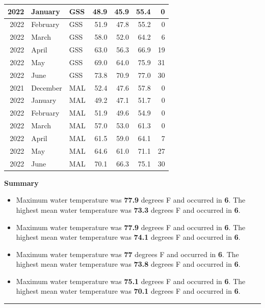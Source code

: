 \documentclass[
]{book}
\providecommand{\tightlist}{%
  \setlength{\itemsep}{0pt}\setlength{\parskip}{0pt}}
\theoremstyle{definition}
\theoremstyle{definition}
\theoremstyle{definition}
\theoremstyle{definition}
\theoremstyle{remark}
\begin{document}
\begin{table}
\begin{tabular}[t]{rllrrrr}
\hline
2022 & January & GSS & 48.9 & 45.9 & 55.4 & 0\\
\hline
2022 & February & GSS & 51.9 & 47.8 & 55.2 & 0\\
\hline
2022 & March & GSS & 58.0 & 52.0 & 64.2 & 6\\
\hline
2022 & April & GSS & 63.0 & 56.3 & 66.9 & 19\\
\hline
2022 & May & GSS & 69.0 & 64.0 & 75.9 & 31\\
\hline
2022 & June & GSS & 73.8 & 70.9 & 77.0 & 30\\
\hline
2021 & December & MAL & 52.4 & 47.6 & 57.8 & 0\\
\hline
2022 & January & MAL & 49.2 & 47.1 & 51.7 & 0\\
\hline
2022 & February & MAL & 51.9 & 49.6 & 54.9 & 0\\
\hline
2022 & March & MAL & 57.0 & 53.0 & 61.3 & 0\\
\hline
2022 & April & MAL & 61.5 & 59.0 & 64.1 & 7\\
\hline
2022 & May & MAL & 64.6 & 61.0 & 71.1 & 27\\
\hline
2022 & June & MAL & 70.1 & 66.3 & 75.1 & 30\\
\hline
\end{tabular}
\end{table}

\textbf{Summary}

\begin{itemize}
\tightlist
\item
  Maximum water temperature was \textbf{77.9} degrees F and occurred in \textbf{6}. The highest mean water temperature was \textbf{73.3} degrees F and occurred in \textbf{6}.
\item
  Maximum water temperature was \textbf{77.9} degrees F and occurred in \textbf{6}. The highest mean water temperature was \textbf{74.1} degrees F and occurred in \textbf{6}.
\item
  Maximum water temperature was \textbf{77} degrees F and occurred in \textbf{6}. The highest mean water temperature was \textbf{73.8} degrees F and occurred in \textbf{6}.
\item
  Maximum water temperature was \textbf{75.1} degrees F and occurred in \textbf{6}. The highest mean water temperature was \textbf{70.1} degrees F and occurred in \textbf{6}.
\end{itemize}

\begin{center}\rule{0.5\linewidth}{0.5pt}\end{center}
\end{document}
